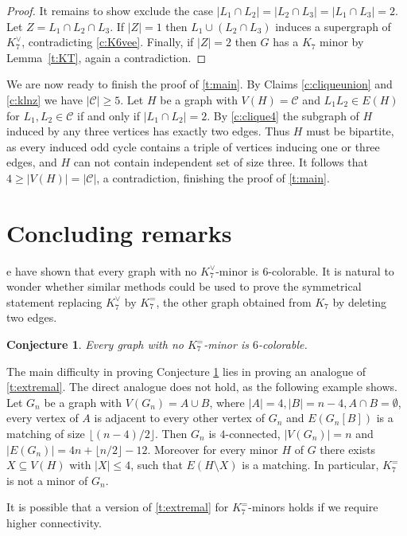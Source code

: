\documentclass[reqno,final,12pt]{amsart}
\newtheorem{conj}[thm]{Conjecture}
\newcommand{\mc}[1]{\mathcal{#1}}
\begin{document}
{\begin{proof}
It remains to show exclude the case $|L_1 \cap L_2|=|L_2 \cap L_3|=|L_1 \cap L_3| = 2$. Let $Z = L_1 \cap L_2 \cap L_3$. If $|Z|=1$ then $L_1 \cup (L_2 \cap L_3)$ induces a supergraph of $K_7^{\vee}$, contradicting \cref{c:K6vee}. Finally, if $|Z|=2$ then $G$ has a $K_7$ minor by Lemma~\ref{t:KT}, again a contradiction.
\end{proof}	

We are now ready to finish the proof of \cref{t:main}. By Claims \ref{c:cliqueunion} and \ref{c:klnz} we have $|\mc{C}| \geq 5$. Let $H$ be a graph with $V(H) = \mc{C}$ and $L_1L_2 \in E(H)$ for $L_1,L_2 \in \mc{C}$ if and only if $|L_1 \cap L_2 |=2$. By \cref{c:clique4} the subgraph of $H$ induced by any three vertices has exactly two edges. Thus $H$ must be bipartite, as every induced odd cycle contains a triple of vertices inducing one or three edges, and $H$ can not contain independent set of size three. It follows that $4  \geq |V(H)|=|\mc{C}|$, a contradiction, finishing the proof of \cref{t:main}. 

\section{Concluding remarks}\label{s:remarks}

e have shown that every graph with no 	$K_7^{\vee}$-minor is $6$-colorable. It is natural to wonder whether similar methods could be used to prove  the symmetrical statement replacing $K_7^{\vee}$ by  $K_7^{=}$, the other graph obtained from $K_7$ by deleting two edges.

\begin{conj}\label{c:K7=}
	Every graph with no  $K_7^{=}$-minor is $6$-colorable.
\end{conj}

The main difficulty in proving Conjecture \ref{c:K7=} lies in proving an analogue of \cref{t:extremal}. The direct analogue does not hold, as the following example shows. Let $G_n$ be a graph with $V(G_n)=A \cup B$, where $|A|=4, |B|=n-4, A\cap B = \emptyset$, every vertex of $A$ is adjacent to every other vertex of $G_n$ and $E(G_n[B])$ is a matching of size $\lfloor (n-4)/2 \rfloor$. Then $G_n$ is $4$-connected, $|V(G_n)|=n$ and $|E(G_n)| = 4n + \lfloor n/2 \rfloor - 12$. Moreover for every minor $H$ of $G$ there exists $X \subseteq V(H)$ with $|X| \leq 4$, such that $E(H \setminus X)$ is a matching. In particular, $K_7^{=}$ is not a minor of $G_n$. 

It is possible that a version of \cref{t:extremal} for $K_7^{=}$-minors holds if we require higher connectivity.

}
\end{document}
